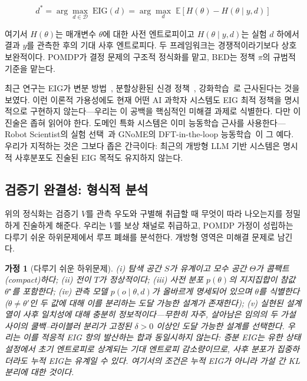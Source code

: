 \documentclass[11pt]{article}
\newtheorem{assumption}{가정}
\begin{document}
\begin{equation}
  d^* = \arg\max_{d \in \mathcal{D}}\; \mathrm{EIG}(d) = \arg\max_{d}\; \mathbb{E}\left[H(\theta) - H(\theta \mid y, d)\right]
  \label{eq:eid}
\end{equation}

여기서 $H(\theta)$는 매개변수 $\theta$에 대한 사전 엔트로피이고 $H(\theta \mid y, d)$는 실험 $d$ 하에서 결과 $y$를 관측한 후의 기대 사후 엔트로피다. 두 프레임워크는 경쟁적이라기보다 상호 보완적이다. POMDP가 결정 문제의 구조적 정식화를 맡고, BED는 정책 $\pi$의 규범적 기준을 맡는다.

최근 연구는 EIG가 변분 방법~\citep{foster2019variational}, 분할상환된 신경 정책~\citep{foster2021dad}, 강화학습~\citep{blau2022rl}로 근사된다는 것을 보였다. 이런 이론적 가용성에도 현재 어떤 AI 과학자 시스템도 EIG 최적 정책을 명시적으로 구현하지 않는다---우리는 이 공백을 핵심적인 미해결 과제로 식별한다. 다만 이 진술은 좁혀 읽어야 한다. 도메인 특화 시스템은 이미 능동학습 근사를 사용한다---Robot Scientist의 실험 선택~\citep{king2004robot}과 GNoME의 DFT-in-the-loop 능동학습~\citep{merchant2023gnome}이 그 예다. 우리가 지적하는 것은 그보다 좁은 간극이다: 최근의 개방형 LLM 기반 시스템은 명시적 사후분포도 진술된 EIG 목적도 유지하지 않는다.

\subsection{검증기 완결성: 형식적 분석}
\label{sec:vformal}

위의 정식화는 검증기 $V$를 관측 우도와 구별해 취급할 때 무엇이 따라 나오는지를 정밀하게 진술하게 해준다. 우리는 $V$를 보상 채널로 취급하고, POMDP 가정이 성립하는 다루기 쉬운 하위문제에서 루프 폐쇄를 분석한다. 개방형 영역은 미해결 문제로 남긴다.

\begin{assumption}[다루기 쉬운 하위문제]
\label{asm:tract}
(i) 탐색 공간 $S$가 유계이고 모수 공간 $\Theta$가 콤팩트(compact)하다; (ii) 전이 $T$가 정상적이다; (iii) 사전 분포 $p(\theta)$의 지지집합이 참값 $\theta^\star$를 포함한다; (iv) 관측 모델 $p(o \mid \theta, d)$가 올바르게 명세되어 있으며 $\theta$를 식별한다($\theta \neq \theta'$인 두 값에 대해 이를 분리하는 도달 가능한 설계가 존재한다); (v) 실현된 설계 열이 사후 일치성에 대해 \emph{충분히 정보적}이다---무한히 자주, 살아남은 임의의 두 가설 사이의 쿨백--라이블러 분리가 고정된 $\delta>0$ 이상인 도달 가능한 설계를 선택한다. 우리는 이를 적응적 EIG 항의 발산하는 합과 동일시하지 않는다: 증분 EIG는 유한 상태 설정에서 초기 엔트로피로 상계되는 기대 엔트로피 감소량이므로, 사후 분포가 집중하더라도 누적 EIG는 유계일 수 있다. 여기서의 조건은 누적 EIG가 아니라 가설 간 KL 분리에 대한 것이다.
\end{assumption}
\end{document}
